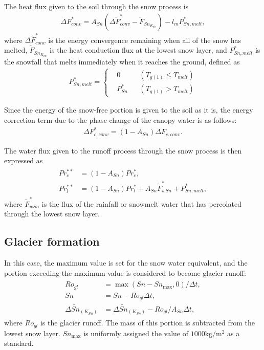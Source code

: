 The heat flux given to the soil through the snow process is \begin{eqnarray}
\Delta F_{conv}^{\ast}
 = A_{Sn} (\Delta\widetilde{F}_{conv}^{\ast} - \widetilde{F}_{Sn_{K_{Sn}}}) - l_m P_{Sn,melt}^{\ast}, \label{8-40}
\end{eqnarray} where \(\Delta\widetilde{F}_{conv}^{\ast}\) is the energy convergence remaining when all of the snow has melted, \(\widetilde{F}_{Sn_{K_{Sn}}}\) is the heat conduction flux at the lowest snow
layer, and \(P_{Sn,melt}^{\ast}\) is the snowfall that melts immediately when it reaches the ground, defined as \begin{eqnarray}
P_{Sn,melt}^{\ast} = \left\{ \begin{aligned}
& 0            && (T_{g(1)} \le T_{melt}) \\
& P_{Sn}^{\ast} && (T_{g(1)} > T_{melt})
\end{aligned} \right. \label{8-41}
\end{eqnarray}

Since the energy of the snow-free portion is given to the soil as it is, the energy correction term due to the phase change of the canopy water is as follows: \begin{eqnarray}
 \Delta F_{c,conv}^{\ast} = (1 - A_{Sn}) \Delta F_{c,conv}. \label{8-42}
\end{eqnarray}

The water flux given to the runoff process through the snow process is then expressed as \begin{eqnarray}
\begin{aligned}
 Pr_c^{\ast\ast} &= ( 1 - A_{Sn} ) Pr_c^{\ast}, \\
 Pr_l^{\ast\ast} &= ( 1 - A_{Sn} ) Pr_l^{\ast} + A_{Sn} \widetilde{F}_{wSn}^{\ast} + P_{Sn,melt}^{\ast},
\end{aligned} \label{8-43}
\end{eqnarray} where \(\widetilde{F}_{wSn}^{\ast}\) is the flux of the rainfall or snowmelt water that has percolated through the lowest snow layer.

\subsection{Glacier formation}\label{glacier-formation}

In this case, the maximum value is set for the snow water equivalent, and the portion exceeding the maximum value is considered to become glacier runoff: \begin{eqnarray}
\begin{aligned}
 Ro_{gl} &= \max(Sn - Sn_{\mathrm{max}}, 0) / \Delta t, \\
 Sn &= Sn - Ro_{gl} \Delta t, \\
 \Delta \widetilde{Sn}_{(K_{Sn})} &= \Delta \widetilde{Sn}_{(K_{Sn})} - Ro_{gl} / A_{Sn} \Delta t,
\end{aligned} \label{8-44}
\end{eqnarray} where \(Ro_{gl}\) is the glacier runoff. The mass of this portion is subtracted from the lowest snow layer. \(Sn_{\max}\) is uniformly assigned the value of \(1000 \mathrm{kg/m^2}\) as a standard.

